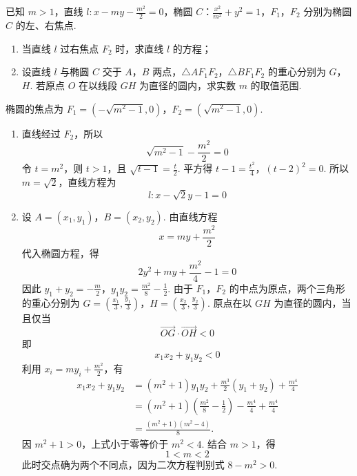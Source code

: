 \begin{problem}
已知 \(m > 1\)，直线 \(l: x - my - \frac{m^2}{2} = 0\)，椭圆 \(C\)：\(\frac{x^2}{m^2} + y^2 = 1\)，\(F_1\)，\(F_2\) 分别为椭圆 \(C\) 的左、右焦点.

\begin{enumerate}
\item 当直线 \(l\) 过右焦点 \(F_2\) 时，求直线 \(l\) 的方程；
\item 设直线 \(l\) 与椭圆 \(C\) 交于 \(A\)，\(B\) 两点，\(\triangle AF_1F_2\)，\(\triangle BF_1F_2\) 的重心分别为 \(G\)，\(H\). 若原点 \(O\) 在以线段 \(GH\) 为直径的圆内，求实数 \(m\) 的取值范围.
\end{enumerate}


\begin{solution}
椭圆的焦点为 \(F_1=(-\sqrt{m^2-1},0)\)，\(F_2=(\sqrt{m^2-1},0)\).

\begin{enumerate}
\item 直线经过 \(F_2\)，所以
\[
\sqrt{m^2-1}-\frac{m^2}{2}=0
\]
令 \(t=m^2\)，则 \(t>1\)，且 \(\sqrt{t-1}=\frac t2\). 平方得
\(t-1=\frac{t^2}{4}\)，\((t-2)^2=0\).
所以 \(m=\sqrt2\)，直线方程为
\[
l:x-\sqrt2y-1=0
\]

\item 设 \(A=(x_1,y_1)\)，\(B=(x_2,y_2)\). 由直线方程
\[
x=my+\frac{m^2}{2}
\]
代入椭圆方程，得
\[
2y^2+my+\frac{m^2}{4}-1=0
\]
因此
\(y_1+y_2=-\frac m2\)，\(y_1y_2=\frac{m^2}{8}-\frac12\).
由于 \(F_1\)，\(F_2\) 的中点为原点，两个三角形的重心分别为
\(G=\left(\frac{x_1}{3},\frac{y_1}{3}\right)\)，\(H=\left(\frac{x_2}{3},\frac{y_2}{3}\right)\).
原点在以 \(GH\) 为直径的圆内，当且仅当
\[
\overrightarrow{OG}\cdot\overrightarrow{OH}<0
\]
即
\[
x_1x_2+y_1y_2<0
\]
利用 \(x_i=my_i+\frac{m^2}{2}\)，有
\[
\begin{aligned}
x_1x_2+y_1y_2
&=(m^2+1)y_1y_2+\frac{m^3}{2}(y_1+y_2)+\frac{m^4}{4}\\
&=(m^2+1)\left(\frac{m^2}{8}-\frac12\right)-\frac{m^4}{4}+\frac{m^4}{4}\\
&=\frac{(m^2+1)(m^2-4)}8.
\end{aligned}
\]
因 \(m^2+1>0\)，上式小于零等价于 \(m^2<4\). 结合 \(m>1\)，得
\[
1<m<2
\]
此时交点确为两个不同点，因为二次方程判别式 \(8-m^2>0\).
\end{enumerate}
\end{solution}
\end{problem}

